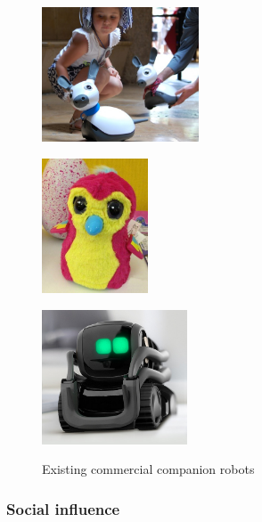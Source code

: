 \documentclass[]{article}
\begin{document}
\begin{figure}[!htbp]
    \begin{minipage}[b]{.3\linewidth}
        \centering\includegraphics[height=4cm]{figs/miro.jpg}
        \label{fig:miro}
    \end{minipage}%
    \hspace{0.1cm}
    \begin{minipage}[b]{.3\linewidth}
        \centering
        \includegraphics[height=4cm]{figs/hatchnimals.jpg}
        \label{fig:hatchimals}
    \end{minipage}%
    \hspace{0.1cm}
    \begin{minipage}[b]{.3\linewidth}
        \centering
        \includegraphics[height=4cm]{figs/anki-vector.jpg}
        \label{fig:vector}
    \end{minipage}
    \caption{Existing commercial companion robots}\label{fig:commercial-robots}
\end{figure}

\subsubsection{Social influence}
\end{document}
